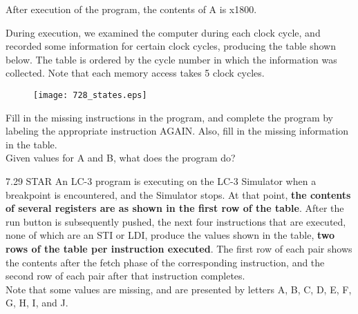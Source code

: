 \documentclass{patt}
\begin{document}
\begin{exercises}
\noindent
After execution of the program, the contents of A is x1800.  

\vspace{.1in}
\noindent
During execution, we examined the computer during each clock cycle, and
recorded some information for certain clock cycles, producing the table
shown below. The table is ordered by the cycle number in which the
information was collected. Note that each memory access takes 5 clock cycles. \\

\begin{figure}[h]
\begin{center}
\texttt{[image: 728\_states.eps]}
\end{center}
\end{figure}

\noindent
Fill in the missing instructions in the program, and
complete the program by labeling the appropriate instruction AGAIN. Also, fill in
the missing information in the table.\\

\noindent
Given values for A and B, what does the program do?\\

\FloatBarrier

\item[7.29]STAR An LC-3 program is executing on the LC-3 Simulator when a
breakpoint is encountered, and the Simulator stops.  At that point, {\bf the
contents of several registers are as shown in the first row of the table}.
After the run button is subsequently pushed, the next four instructions that
are executed, none of which are an STI or LDI, produce the values shown in the
table, {\bf two rows of the table per instruction executed}.  The first row of
each pair shows the contents after the fetch phase of the corresponding
instruction, and the second row of each pair after that instruction completes.
\\

\noindent
Note that some values are missing, and are presented by letters A, B, C, D, E,
F, G, H, I, and J. \\


\end{exercises}
\end{document}

